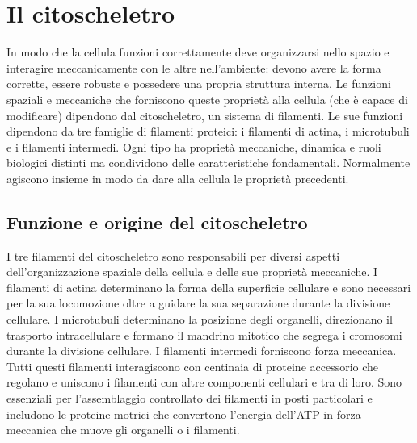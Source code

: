 \chapter{Il citoscheletro}
In modo che la cellula funzioni correttamente deve organizzarsi nello spazio e interagire meccanicamente con le altre nell'ambiente: devono avere la forma corrette, essere robuste e 
possedere una propria struttura interna. Le funzioni spaziali e meccaniche che forniscono queste propriet\`a alla cellula (che \`e capace di modificare) dipendono dal citoscheletro, un 
sistema di filamenti. Le sue funzioni dipendono da tre famiglie di filamenti proteici: i filamenti di actina, i microtubuli e i filamenti intermedi. Ogni tipo ha propriet\`a meccaniche, 
dinamica e ruoli biologici distinti ma condividono delle caratteristiche fondamentali. Normalmente agiscono insieme in modo da dare alla cellula le propriet\`a precedenti. 
\section{Funzione e origine del citoscheletro}
I tre filamenti del citoscheletro sono responsabili per diversi aspetti dell'organizzazione spaziale della cellula e delle sue propriet\`a meccaniche. I filamenti di actina determinano 
la forma della superficie cellulare e sono necessari per la sua locomozione oltre a guidare la sua separazione durante la divisione cellulare. I microtubuli determinano la posizione 
degli organelli, direzionano il trasporto intracellulare e formano il mandrino mitotico che segrega i cromosomi durante la divisione cellulare. I filamenti intermedi forniscono forza
meccanica. Tutti questi filamenti interagiscono con centinaia di proteine accessorio che regolano e uniscono i filamenti con altre componenti cellulari e tra di loro. Sono essenziali 
per l'assemblaggio controllato dei filamenti in posti particolari e includono le proteine motrici che convertono l'energia dell'ATP in forza meccanica che muove gli organelli o i 
filamenti. 
